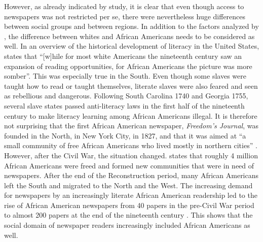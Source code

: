 However, as already indicated by  study, it is clear that even though access to newspapers was not restricted per se, there were nevertheless huge differences between social groups and between regions. In addition to the factors analyzed by \citet{Nord2001}, the difference between whites and African Americans needs to be considered as well. In an overview of the historical development of literacy in the United States, \citet[49]{Pawley2010} states that “[w]hile for most white Americans the nineteenth century saw an expansion of reading opportunities, for African Americans the picture was more somber”. This was especially true in the South. Even though some slaves were taught how to read or taught themselves, literate slaves were also feared and seen as rebellious and dangerous. Following South Carolina 1740 and Georgia 1755, several slave states passed anti-literacy laws in the first half of the nineteenth century to make literacy learning among African Americans illegal. It is therefore not surprising that the first African American newspaper, \emph{Freedom’s Journal}, was founded in the North, in New York City, in 1827, and that it was aimed at “a small community of free African Americans who lived mostly in northern cities” \citep[26]{Amana1998}. However, after the Civil War, the situation changed. \citet[26]{Amana1998} states that roughly 4 million African Americans were freed and formed new communities that were in need of newspapers. After the end of the Reconstruction period, many African Americans left the South and migrated to the North and the West. The increasing demand for newspapers by an increasingly literate African American readership led to the rise of African American newspapers from 40 papers in the pre-Civil War period to almost 200 papers at the end of the nineteenth century \citep[26]{Amana1998}. This shows that the social domain of newspaper readers increasingly included African Americans as well.


